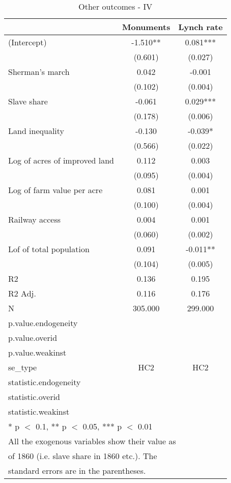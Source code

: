 \begin{table}

\caption{\label{tab:}Other outcomes - IV}
\centering
\begin{tabular}[t]{lcc}
\toprule
  & Monuments & Lynch rate\\
\midrule
(Intercept) & -1.510** & 0.081***\\
 & (0.601) & (0.027)\\
Sherman's march & 0.042 & -0.001\\
 & (0.102) & (0.004)\\
Slave share & -0.061 & 0.029***\\
 & (0.178) & (0.006)\\
Land inequality & -0.130 & -0.039*\\
 & (0.566) & (0.022)\\
Log of acres of improved land & 0.112 & 0.003\\
 & (0.095) & (0.004)\\
Log of farm value per acre & 0.081 & 0.001\\
 & (0.100) & (0.004)\\
Railway access & 0.004 & 0.001\\
 & (0.060) & (0.002)\\
Lof of total population & 0.091 & -0.011**\\
 & (0.104) & (0.005)\\
\midrule
R2 & 0.136 & 0.195\\
R2 Adj. & 0.116 & 0.176\\
N & 305.000 & 299.000\\
p.value.endogeneity &  & \\
p.value.overid &  & \\
p.value.weakinst &  & \\
se\_type & HC2 & HC2\\
statistic.endogeneity &  & \\
statistic.overid &  & \\
statistic.weakinst &  & \\
\bottomrule
\multicolumn{3}{l}{\textsuperscript{} * p $<$ 0.1, ** p $<$ 0.05, *** p $<$ 0.01}\\
\multicolumn{3}{l}{\textsuperscript{} All the exogenous variables show their value as}\\
\multicolumn{3}{l}{of 1860 (i.e. slave share in 1860 etc.). The}\\
\multicolumn{3}{l}{standard errors are in the parentheses.}\\
\end{tabular}
\end{table}
